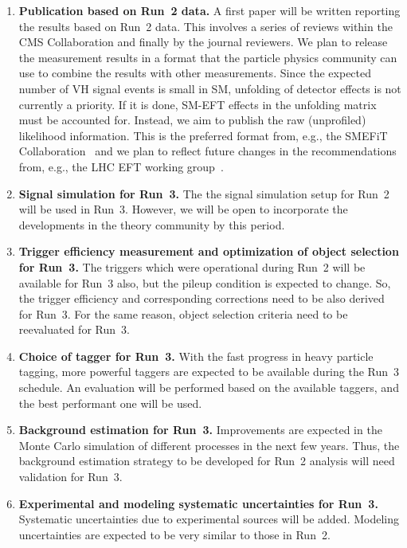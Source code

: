 \documentclass[a4paper,11pt]{article}
\begin{document}
\begin{enumerate}[noitemsep,topsep=0pt]
\item {\bf Publication based on Run~2 data.} A first paper will be written reporting the results based on Run~2 data. This involves a series of reviews within the CMS Collaboration and finally by the journal reviewers. 
We plan to release the measurement results in a format that the particle physics community can use to combine the results with other measurements. Since the expected number of VH signal events is small in SM, unfolding of detector effects is not currently a priority. If it is done, SM-EFT effects in the unfolding matrix must be accounted for. Instead, we aim to publish the raw (unprofiled) likelihood information. This is the preferred format from, e.g., the SMEFiT Collaboration~\cite{SMEFTFiT} and we plan to reflect future changes in the recommendations from, e.g., the LHC EFT working group~\cite{LHC_EFT_WG}.

\item {\bf Signal simulation for Run~3.} The the signal simulation setup for Run~2 will be used in Run~3. However, we will be open to incorporate the developments in the theory community by this period. 

\item {\bf Trigger efficiency measurement and optimization of object selection for Run~3.} The triggers which were operational during Run~2 will be available for Run~3 also, but the pileup condition is expected to change. So, the trigger efficiency and corresponding corrections need to be also derived for Run~3. 
For the same reason, object selection criteria need to be reevaluated for Run~3. 

\item {\bf Choice of \PH tagger for Run~3.} With the fast progress in heavy particle tagging, more powerful taggers are expected to be available during the Run~3 schedule. An evaluation will be performed based on the available taggers, and the best performant one will be used. 

\item {\bf Background estimation for Run~3.} Improvements are expected in the Monte Carlo simulation of different processes in the next few years. Thus, the background estimation strategy to be developed for Run~2 analysis will need validation for Run~3.

\item {\bf Experimental and modeling systematic uncertainties for Run~3.} Systematic uncertainties due to experimental sources will be added. Modeling uncertainties are expected to be very similar to those in Run~2.


\end{enumerate}
\end{document}
